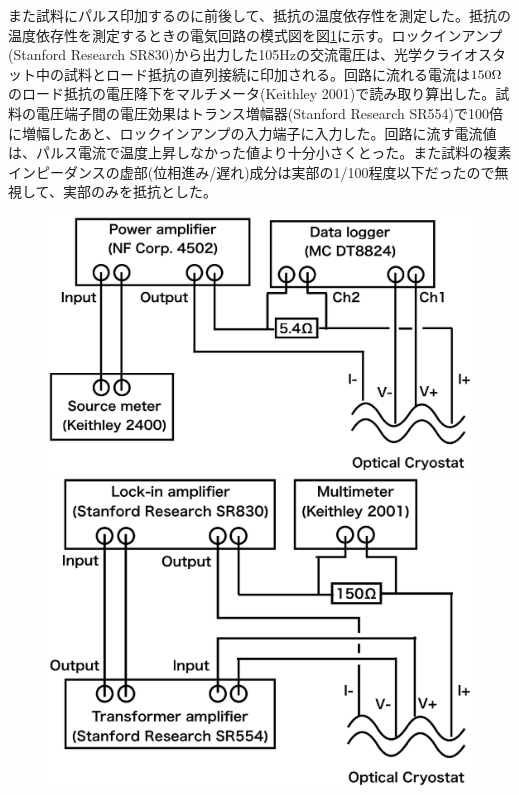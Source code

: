 また試料にパルス印加するのに前後して、抵抗の温度依存性を測定した。抵抗の温度依存性を測定するときの電気回路の模式図を図\ref{fig:schematics_lockin}に示す。ロックインアンプ(Stanford Research SR830)から出力した105Hzの交流電圧は、光学クライオスタット中の試料とロード抵抗の直列接続に印加される。回路に流れる電流は$\rm 150\Omega$のロード抵抗の電圧降下をマルチメータ(Keithley 2001)で読み取り算出した。試料の電圧端子間の電圧効果はトランス増幅器(Stanford Research SR554)で100倍に増幅したあと、ロックインアンプの入力端子に入力した。回路に流す電流値は、パルス電流で温度上昇しなかった値より十分小さくとった。また試料の複素インピーダンスの虚部(位相進み/遅れ)成分は実部の1/100程度以下だったので無視して、実部のみを抵抗とした。
\begin{figure}[!h]
 \begin{minipage}{\hsize}
    \begin{center}
   \includegraphics[width=0.7\hsize]{experiment/schematics_pulse.eps}
  \end{center}
  \caption{}
  \label{fig:schematics_pulse}
 \end{minipage}
 \begin{minipage}{\hsize}
     \begin{center}
   \includegraphics[width=0.7\hsize]{experiment/schematics_lockin.eps}
  \end{center}
  \caption{}
  \label{fig:schematics_lockin}
   \end{minipage}
\end{figure}


